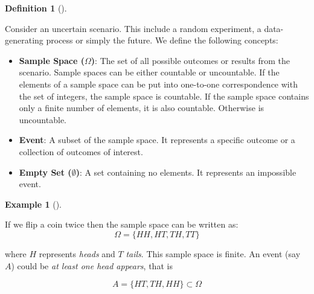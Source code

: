 \documentclass[
  letterpaper,
  DIV=11,
  numbers=noendperiod]{scrreport}
\newenvironment{Shaded}{\begin{snugshade}}{\end{snugshade}}
\theoremstyle{definition}
\newtheorem{example}{Example}[chapter]
\theoremstyle{plain}
\theoremstyle{definition}
\newtheorem{definition}{Definition}[chapter]
\theoremstyle{plain}
\theoremstyle{remark}
\begin{document}
\begin{tcolorbox}[enhanced jigsaw, breakable, opacityback=0, leftrule=.75mm, colback=white, bottomtitle=1mm, coltitle=black, toptitle=1mm, titlerule=0mm, bottomrule=.15mm, colframe=quarto-callout-note-color-frame, title={Definition: Sample Space, Event, and Empty Set}, opacitybacktitle=0.6, colbacktitle=quarto-callout-note-color!10!white, rightrule=.15mm, arc=.35mm, toprule=.15mm, left=2mm]

\begin{definition}[]\protect\hypertarget{def-1.1.1}{}\label{def-1.1.1}

Consider an uncertain scenario. This include a random experiment, a
data-generating process or simply the future. We define the following
concepts:

\begin{Shaded}
\begin{Highlighting}[numbers=left,,]

\end{Highlighting}
\end{Shaded}

\begin{itemize}
\item
  \textbf{Sample Space (\(\Omega\))}: The set of all possible outcomes
  or results from the scenario. Sample spaces can be either countable or
  uncountable. If the elements of a sample space can be put into
  one-to-one correspondence with the set of integers, the sample space
  is countable. If the sample space contains only a finite number of
  elements, it is also countable. Otherwise is uncountable.
\item
  \textbf{Event}: A subset of the sample space. It represents a specific
  outcome or a collection of outcomes of interest.
\item
  \textbf{Empty Set (\(\emptyset\))}: A set containing no elements. It
  represents an impossible event.
\end{itemize}

\end{definition}

\end{tcolorbox}

\begin{example}[]\protect\hypertarget{exm-1-1.1}{}\label{exm-1-1.1}

If we flip a coin twice then the sample space can be written as: \[
\Omega =\{HH,HT,TH,TT\}
\]

where \(H\) represents \emph{heads} and \(T\) \emph{tails}. This sample
space is finite. An event (say \(A\)) could be \emph{at least one head
appears}, that is

\[A =\{HT,TH,HH\}\subset \Omega\]

\end{example}
\end{document}
